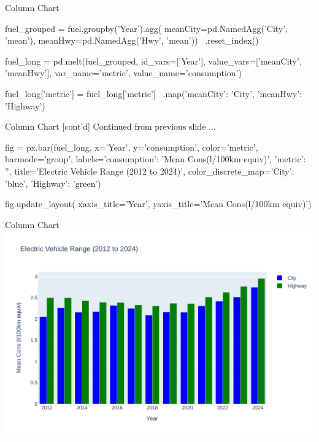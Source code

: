 \documentclass[ignorenonframetext,xcolor=x11names]{beamer}
\begin{document}
\begin{frame}[fragile]{Column Chart}
\footnotesize
\begin{pythoncode}
fuel_grouped = fuel.groupby('Year').agg(
       meanCity=pd.NamedAgg('City', 'mean'),
       meanHwy=pd.NamedAgg('Hwy', 'mean')) \
         .reset_index()

fuel_long = pd.melt(fuel_grouped, 
                id_vars=['Year'], 
                value_vars=['meanCity', 'meanHwy'], 
                var_name='metric', 
                value_name='consumption')

fuel_long['metric'] = fuel_long['metric'] \
       .map({'meanCity': 'City', 
             'meanHwy': 'Highway'})
\end{pythoncode}
\end{frame}

\begin{frame}[fragile]{Column Chart \small [cont'd]}
Continued from previous slide ...
\footnotesize
\begin{pythoncode}
fig = px.bar(fuel_long, x='Year', y='consumption', 
   color='metric', barmode='group',
   labels={'consumption': 'Mean Cons\n(l/100km equiv)', 
           'metric': ''},
   title='Electric Vehicle Range (2012 to 2024)',
   color_discrete_map={'City': 'blue', 
                       'Highway': 'green'})

fig.update_layout(
    xaxis_title='Year', 
    yaxis_title='Mean Cons\n(l/100km equiv)')
\end{pythoncode}
\end{frame}

\begin{frame}{Column Chart}
  \includegraphics[width=\textwidth]{px.fuel.columns.pdf}
\end{frame}
\end{document}
